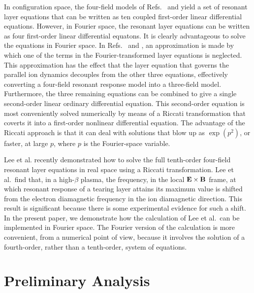 \documentclass[12pt,prb,aps]{revtex4-1}
\begin{document}
 In configuration space, the four-field models of Refs.~ and  yield a set of resonant layer equations that can be written as 
 ten coupled
 first-order linear differential equations.\cite{lee} However, in Fourier space, the resonant layer equations can be written as 
 four first-order linear differential equatons.\cite{cole} It is clearly advantageous to solve the equations in Fourier space. In Refs.~
 and , an approximation is made by which one of the terms in the Fourier-transformed layer equations is neglected. This
 approximation has the effect that the layer equation that governs the parallel ion dynamics decouples from the other three equations, effectively
 converting a four-field resonant response model into a three-field model. Furthermore, the three remaining equations can be combined to give a
 single second-order linear ordinary differential equation. This second-order equation is most conveniently solved numerically by means of a Riccati transformation
 that coverts it into a first-order nonlinear differential equation.\cite{ric1,ric2} The advantage of the Riccati approach is that it can deal with solutions
 that blow up as $\exp(p^2)$, or faster, at large $p$, where $p$ is the Fourier-space variable. 
 
 Lee et al.\cite{lee} recently demonstrated  how to solve the full tenth-order four-field resonant layer equations in real space using a Riccati transformation. 
 Lee et al.\  find  that, in a high-$\beta$ plasma,  the frequency, in the local ${\bf E}\times {\bf B}$ frame,  at which resonant response of
 a tearing layer attains its maximum value  is shifted from the electron diamagnetic frequency in the ion diamagnetic direction.
 This result is significant because there is some experimental evidence for such a shift.\cite{paz} In the present paper, we demonstrate how the calculation of
 Lee et al.\ can be implemented in Fourier space. The Fourier version of the calculation is more convenient, from a numerical point of view, because
 it involves the solution of a fourth-order, rather than a tenth-order, system of equations. 

\section{Preliminary Analysis}\label{sect1}
\end{document}
